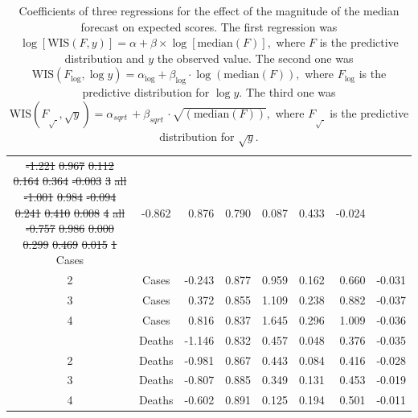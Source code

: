 \documentclass{article}
\providecommand{\DIFaddtex}[1]{{\protect\color{blue}\uwave{#1}}} %
\providecommand{\DIFdeltex}[1]{{\protect\color{red}\sout{#1}}}                      %
\providecommand{\DIFaddFL}[1]{\DIFadd{#1}} %
\providecommand{\DIFdelFL}[1]{\DIFdel{#1}} %
\providecommand{\DIFaddbeginFL}{} %
\providecommand{\DIFaddendFL}{} %
\providecommand{\DIFdelbeginFL}{} %
\providecommand{\DIFdelendFL}{} %
\providecommand{\DIFadd}[1]{\texorpdfstring{\DIFaddtex{#1}}{#1}} %
\providecommand{\DIFdel}[1]{\texorpdfstring{\DIFdeltex{#1}}{}} %
\newcommand{\DIFscaledelfig}{0.5}
\newlength{\DIFdelgraphicswidth} %
\newlength{\DIFdelgraphicsheight} %
\newcommand{\DIFaddincludegraphics}[2][]{{\color{blue}\fbox{\DIFOincludegraphics[#1]{#2}}}} %
\newcommand{\DIFdelincludegraphics}[2][]{%
\sbox{\DIFdelgraphicsbox}{\DIFOincludegraphics[#1]{#2}}%
\settoboxwidth{\DIFdelgraphicswidth}{\DIFdelgraphicsbox} %
\settoboxtotalheight{\DIFdelgraphicsheight}{\DIFdelgraphicsbox} %
\scalebox{\DIFscaledelfig}{%
\parbox[b]{\DIFdelgraphicswidth}{\usebox{\DIFdelgraphicsbox}\\[-\baselineskip] \rule{\DIFdelgraphicswidth}{0em}}\llap{\resizebox{\DIFdelgraphicswidth}{\DIFdelgraphicsheight}{%
\setlength{\unitlength}{\DIFdelgraphicswidth}%
\begin{picture}(1,1)%
\thicklines\linethickness{2pt} %
{\color[rgb]{1,0,0}\put(0,0){\framebox(1,1){}}}%
{\color[rgb]{1,0,0}\put(0,0){\line( 1,1){1}}}%
{\color[rgb]{1,0,0}\put(0,1){\line(1,-1){1}}}%
\end{picture}%
}\hspace*{3pt}}} %
} %
\DeclareRobustCommand{\DIFaddbeginFL}{\DIFOaddbeginFL \let\includegraphics\DIFaddincludegraphics} %
\DeclareRobustCommand{\DIFaddendFL}{\DIFOaddendFL \let\includegraphics\DIFOincludegraphics} %
\DeclareRobustCommand{\DIFdelbeginFL}{\DIFOdelbeginFL \let\includegraphics\DIFdelincludegraphics} %
\DeclareRobustCommand{\DIFdelendFL}{\DIFOaddendFL \let\includegraphics\DIFOincludegraphics} %
\begin{document}
\begin{table}
\begin{tabular}{ccrrrrrr}
\DIFdelFL{-1.221 }%
\DIFdelFL{0.967 }%
\DIFdelFL{0.112 }%
\DIFdelFL{0.164 }%
\DIFdelFL{0.364 }%
\DIFdelFL{-0.003}%
\DIFdelFL{3 }%
\DIFdelFL{all }%
\DIFdelFL{-1.001 }%
\DIFdelFL{0.984 }%
\DIFdelFL{-0.094 }%
\DIFdelFL{0.241 }%
\DIFdelFL{0.410 }%
\DIFdelFL{0.008}%
\DIFdelFL{4 }%
\DIFdelFL{all }%
\DIFdelFL{-0.757 }%
\DIFdelFL{0.986 }%
\DIFdelFL{0.000 }%
\DIFdelFL{0.299 }%
\DIFdelFL{0.469 }%
\DIFdelFL{0.015}%
\DIFdelFL{1 }%
\DIFdelendFL Cases & -0.862 & 0.876 & 0.790 & 0.087 & 0.433 & -0.024\\
2 & Cases & -0.243 & 0.877 & 0.959 & 0.162 & 0.660 & -0.031\\
3 & Cases & 0.372 & 0.855 & 1.109 & 0.238 & 0.882 & -0.037\\
4 & Cases & 0.816 & 0.837 & 1.645 & 0.296 & 1.009 & -0.036\\
\addlinespace
1 & Deaths & -1.146 & 0.832 & 0.457 & 0.048 & 0.376 & -0.035\\
2 & Deaths & -0.981 & 0.867 & 0.443 & 0.084 & 0.416 & -0.028\\
3 & Deaths & -0.807 & 0.885 & 0.349 & 0.131 & 0.453 & -0.019\\
4 & Deaths & -0.602 & 0.891 & 0.125 & 0.194 & 0.501 & -0.011\\
\bottomrule
\end{tabular}
\caption{Coefficients of three regressions for the effect of the magnitude of the median forecast on expected scores. The first regression was 
$\log[\text{WIS}(F, y)] = \alpha + \beta \times \log[\text{median}(F)], $ where $F$ is the predictive distribution and $y$ the observed value. The second one was 
$\text{WIS}(F_{\log}, \log y) = \alpha_{\log} + \beta_{\log} \cdot \log{(\text{median}(F))},$ where $F_{\log}$ is the predictive distribution for $\log y$. The third one was \DIFdelbeginFL \DIFdelFL{$\text{WIS}(F_{\sqrt{\ }}, \sqrt{y}) = \alpha_{sqrt{\ }} + \beta_{sqrt{\ }} \cdot \sqrt{(\text{median}(F))},$ }\DIFdelendFL \DIFaddbeginFL \DIFaddFL{$\text{WIS}(F_{\sqrt{\ }}, \sqrt{y}) = \alpha_{\sqrt{\ }} + \beta_{\sqrt{\ }} \cdot \sqrt{(\text{median}(F))},$ }\DIFaddendFL where $F_{\sqrt{\ }}$ is the predictive distribution for $\sqrt{y}$.
}
\label{tab:HUB-regression}
\end{table}
\end{document}

